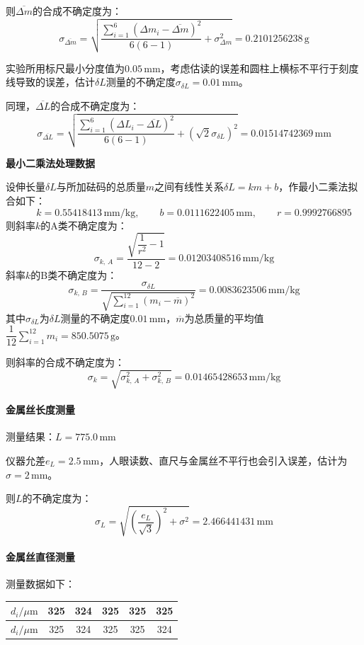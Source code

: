 \documentclass[a4paper,fontset=windows]{ctexart}
\begin{document}
    则$\overline{\Delta m}$的合成不确定度为：
    \[
    \sigma_{\overline{\Delta m}} = \sqrt{\frac{\sum\limits_{i=1}^{6}(\Delta m_i - \overline{\Delta m})^2}{6(6-1)} + \sigma_{\Delta m}^2} = 0.2101256238\,\mathrm{g}
    \]

    实验所用标尺最小分度值为$0.05\,\mathrm{mm}$，考虑估读的误差和圆柱上横标不平行于刻度线导致的误差，估计$\delta L$测量的不确定度$\sigma_{\delta L} = 0.01\,\mathrm{mm}$。

    同理，$\overline{\Delta L}$的合成不确定度为：
    \[
    \sigma_{\overline{\Delta L}} = \sqrt{\frac{\sum\limits_{i=1}^{6}(\Delta L_i - \overline{\Delta L})^2}{6(6-1)} + \left(\sqrt{2}\sigma_{\delta L}\right)^2} = 0.01514742369\,\mathrm{mm}
    \]

    \textbf{最小二乘法处理数据}

    设伸长量$\delta L$与所加砝码的总质量$m$之间有线性关系$\delta L = km+b$，作最小二乘法拟合如下：
    \[
    \qquad k=0.55418413\,\mathrm{mm/kg},\qquad b=0.0111622405\,\mathrm{mm},\qquad r=0.9992766895
    \]
    则斜率$k$的A类不确定度为：
    \[
    \sigma_{k,\, A} = \frac{\sqrt{\dfrac{1}{r^2}-1}}{12-2} = 0.01203408516\,\mathrm{mm/kg}
    \]
    斜率$k$的B类不确定度为：
    \[
    \sigma_{k,\, B} = \frac{\sigma_{\delta L}}{\sqrt{\sum\limits_{i=1}^{12}(m_i - \overline{m})^2}} = 0.0083623506\,\mathrm{mm/kg}
    \]
    其中$\sigma_{\delta L}$为$\delta L$测量的不确定度$0.01\,\mathrm{mm}$，$\overline{m}$为总质量的平均值$\dfrac{1}{12}\sum\limits_{i=1}^{12}m_i = 850.5075\,\mathrm{g}$。

    则斜率的合成不确定度为：
    \[
    \sigma_k = \sqrt{\sigma_{k,\, A}^2 + \sigma_{k,\, B}^2} = 0.01465428653\,\mathrm{mm/kg}
    \]

    \paragraph*{金属丝长度测量} 测量结果：$L = 775.0\,\mathrm{mm}$

    仪器允差$e_L = 2.5\,\mathrm{mm}$，人眼读数、直尺与金属丝不平行也会引入误差，估计为$\sigma = 2\,\mathrm{mm}$。

    则$L$的不确定度为：
    \[
    \sigma_L = \sqrt{\left(\frac{e_L}{\sqrt{3}}\right)^2 + \sigma^2} = 2.466441431\,\mathrm{mm}
    \]

    \paragraph*{金属丝直径测量} 测量数据如下：

    \begin{table}[ht!]
        \begin{center}
            \begin{tabular}{|c|c|c|c|c|c|}
                \hline
                $d_i/\mu\mathrm{m}$ & 325 & 324 & 325 & 325 & 325 \\
                \hline
                $d_i/\mu\mathrm{m}$ & 325 & 324 & 325 & 325 & 324 \\
                \hline
            \end{tabular}
        \end{center}
    \end{table}
    \vspace{-1.5em}
\end{document}

